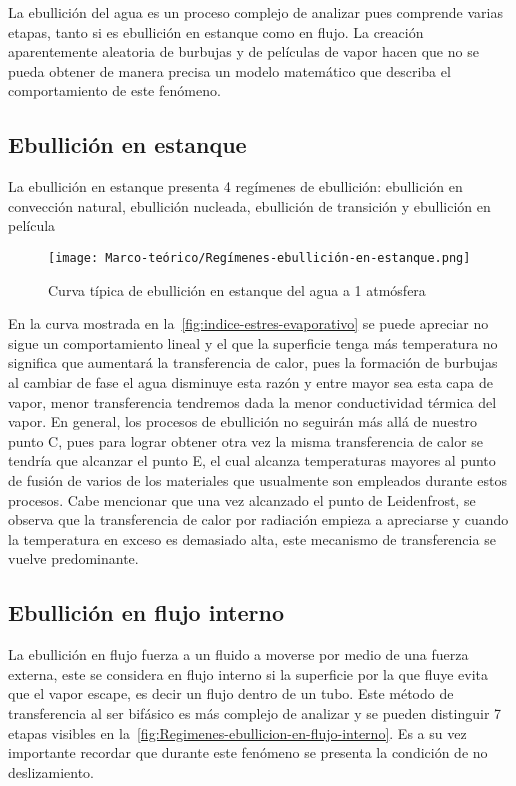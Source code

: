 		La ebullición del agua es un proceso complejo de analizar pues comprende varias etapas, tanto si es ebullición en estanque como en flujo. La creación aparentemente aleatoria de burbujas y de películas de vapor hacen que no se pueda obtener de manera precisa un modelo matemático que describa el comportamiento de este fenómeno.

		\subsection{Ebullición en estanque}

			La ebullición en estanque presenta 4 regímenes de ebullición: ebullición en convección natural, ebullición nucleada, ebullición de transición y ebullición en película

			\begin{figure}[ht]
				\centering
				\texttt{[image: Marco-teórico/Regímenes-ebullición-en-estanque.png]}
				\caption{Curva típica de ebullición en estanque del agua a 1 atmósfera}
				\label{fig:regimenes-ebullicion-en-estanque}
			\end{figure}

			En la curva mostrada en la~\cref{fig:indice-estres-evaporativo} se puede apreciar no sigue un comportamiento lineal y el que la superficie tenga más temperatura no significa que aumentará la transferencia de calor, pues la formación de burbujas al cambiar de fase el agua disminuye esta razón y entre mayor sea esta capa de vapor, menor transferencia tendremos dada la menor conductividad térmica del vapor. En general, los procesos de ebullición no seguirán más allá de nuestro punto C, pues para lograr obtener otra vez la misma transferencia de calor se tendría que alcanzar el punto E, el cual alcanza temperaturas mayores al punto de fusión de varios de los materiales que usualmente son empleados durante estos procesos. Cabe mencionar que una vez alcanzado el punto de Leidenfrost, se observa que la transferencia de calor por radiación empieza a apreciarse y cuando la temperatura en exceso es demasiado alta, este mecanismo de transferencia se vuelve predominante.

		\subsection{Ebullición en flujo interno}

			La ebullición en flujo fuerza a un fluido a moverse por medio de una fuerza externa, este se considera en flujo interno si la superficie por la que fluye evita que el vapor escape, es decir un flujo dentro de un tubo. Este método de transferencia al ser bifásico es más complejo de analizar y se pueden distinguir 7 etapas visibles en la~\cref{fig:Regimenes-ebullicion-en-flujo-interno}. Es a su vez importante recordar que durante este fenómeno se presenta la condición de no deslizamiento.

